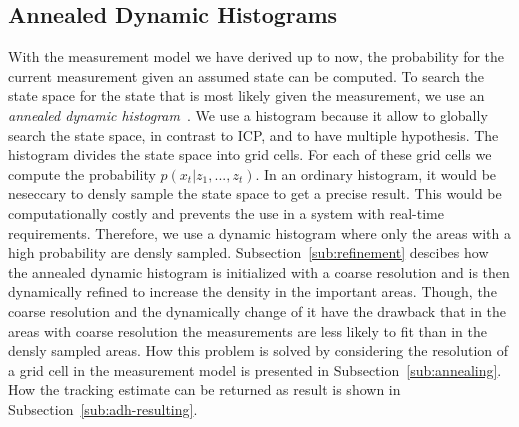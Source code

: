 \documentclass[twoside,a4paper,article]{combine}
\begin{document}
\subsection{Annealed Dynamic Histograms}
\label{sub:adh}
With the measurement model we have derived up to now, the probability
for the current measurement given an assumed state can be computed. To
search the state space for the state that is most likely given the
measurement, we use an \textit{annealed dynamic
  histogram}~\cite{paper}. We use a histogram because it allow to
globally search the state space, in contrast to ICP, and to have
multiple hypothesis. The histogram divides the state space into grid
cells. For each of these grid cells we compute the probability
$p(x_t|z_1,...,z_t)$. In an ordinary histogram, it would be neseccary
to densly sample the state space to get a precise result. This would
be computationally costly and prevents the use in a system with
real-time requirements. Therefore, we use a dynamic histogram where
only the areas with a high probability are densly
sampled. Subsection~\ref{sub:refinement} descibes how the annealed
dynamic histogram is initialized with a coarse resolution and is then
dynamically refined to increase the density in the important
areas. Though, the coarse resolution and the dynamically change of it
have the drawback that in the areas with coarse resolution the
measurements are less likely to fit than in the densly sampled
areas. How this problem is solved by considering the resolution of a
grid cell in the measurement model is presented in
Subsection~\ref{sub:annealing}. How the tracking estimate can be
returned as result is shown in Subsection~\ref{sub:adh-resulting}.
\end{document}
